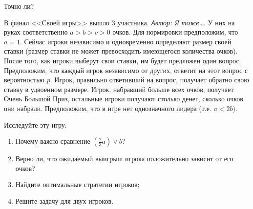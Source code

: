 \begin{problem}
\begin{source}
\cite{lones:dtc} {\red Точно ли?}
\end{source}
В финал <<Своей игры>> вышло 3 участника. { {\it Автор: Я тоже\ldots}}. У них на руках соответственно $a>b>c>0$ очков. Для нормировки предположим, что $a=1$. Сейчас игроки независимо и одновременно определяют размер своей ставки (размер ставки не может превосходить имеющегося количества очков). После того, как игроки выберут свои ставки, им будет предложен один вопрос. Предположим, что каждый игрок независимо от других, ответит на этот вопрос с вероятностью $p$. Игрок, правильно ответивший на вопрос, получает обратно свою ставку в удвоенном размере. Игрок, набравший больше всех очков, получает Очень Большой Приз, остальные игроки получают столько денег, сколько очков они набрали. Предположим, что в игре нет однозначного лидера (т.е. $a<2b$). \par
Исследуйте эту игру: \par
\begin{enumerate}
\item  Почему важно сравнение $\left(\frac{2}{3}a\right) \vee b$? \par
\item Верно ли, что ожидаемый выигрыш игрока положительно зависит от его очков? \par
\item  Найдите оптимальные стратегии игроков; \par
\item Решите задачу для двух игроков. \par
\end{enumerate}



\begin{sol}

\end{sol}
\end{problem}






